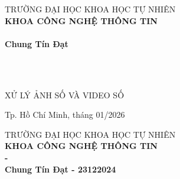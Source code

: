 \begin{titlepage}

\begin{center}
TRƯỜNG ĐẠI HỌC KHOA HỌC TỰ NHIÊN\\
\textbf{KHOA CÔNG NGHỆ THÔNG TIN}\\[2cm]


{ \Large \bfseries \tenSV\\}
{ \Large \bfseries Chung Tín Đạt\\[2cm] } 


{ \Large \bfseries \tenKL\\[3cm]} 


\\ \large XỬ LÝ ẢNH SỐ VÀ VIDEO SỐ\\


\vfill
Tp. Hồ Chí Minh, tháng 01/2026

\end{center}

\pagebreak



\begin{center}

TRƯỜNG ĐẠI HỌC KHOA HỌC TỰ NHIÊN\\
\textbf{KHOA CÔNG NGHỆ THÔNG TIN}\\[2cm]


{\large \bfseries \tenSV  - \mssv\\} 
{\large \bfseries Chung Tín Đạt - 23122024\\[2cm]} 


\end{center}
\end{titlepage}
